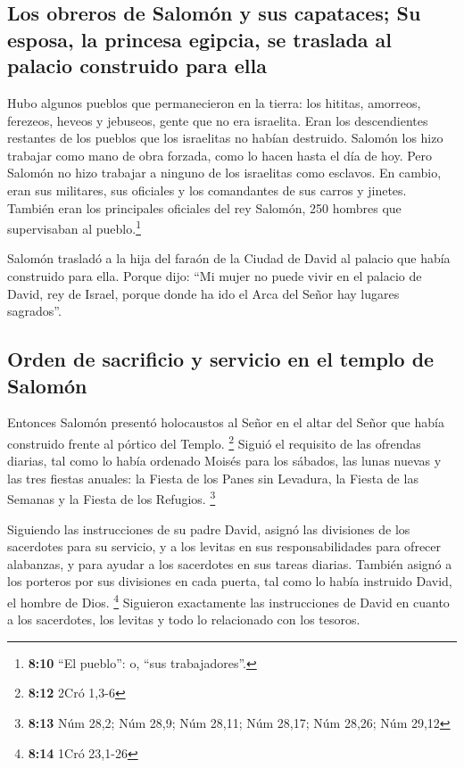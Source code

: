 \hypertarget{los-obreros-de-salomuxf3n-y-sus-capataces-su-esposa-la-princesa-egipcia-se-traslada-al-palacio-construido-para-ella}{%
\subsection{Los obreros de Salomón y sus capataces; Su esposa, la
princesa egipcia, se traslada al palacio construido para
ella}\label{los-obreros-de-salomuxf3n-y-sus-capataces-su-esposa-la-princesa-egipcia-se-traslada-al-palacio-construido-para-ella}}

 Hubo algunos pueblos que permanecieron en la tierra: los
hititas, amorreos, ferezeos, heveos y jebuseos, gente que no era
israelita.  Eran los descendientes restantes de los
pueblos que los israelitas no habían destruido. Salomón los hizo
trabajar como mano de obra forzada, como lo hacen hasta el día de hoy.
 Pero Salomón no hizo trabajar a ninguno de los israelitas
como esclavos. En cambio, eran sus militares, sus oficiales y los
comandantes de sus carros y jinetes.  También eran los
principales oficiales del rey Salomón, 250 hombres que supervisaban al
pueblo.\footnote{\textbf{8:10} ``El pueblo'': o, ``sus trabajadores''.}

 Salomón trasladó a la hija del faraón de la Ciudad de
David al palacio que había construido para ella. Porque dijo: ``Mi mujer
no puede vivir en el palacio de David, rey de Israel, porque donde ha
ido el Arca del Señor hay lugares sagrados''.

\hypertarget{orden-de-sacrificio-y-servicio-en-el-templo-de-salomuxf3n}{%
\subsection{Orden de sacrificio y servicio en el templo de
Salomón}\label{orden-de-sacrificio-y-servicio-en-el-templo-de-salomuxf3n}}

 Entonces Salomón presentó holocaustos al Señor en el
altar del Señor que había construido frente al pórtico del Templo.
\footnote{\textbf{8:12} 2Cró 1,3-6}  Siguió el requisito
de las ofrendas diarias, tal como lo había ordenado Moisés para los
sábados, las lunas nuevas y las tres fiestas anuales: la Fiesta de los
Panes sin Levadura, la Fiesta de las Semanas y la Fiesta de los
Refugios. \footnote{\textbf{8:13} Núm 28,2; Núm 28,9; Núm 28,11; Núm
  28,17; Núm 28,26; Núm 29,12}

 Siguiendo las instrucciones de su padre David, asignó
las divisiones de los sacerdotes para su servicio, y a los levitas en
sus responsabilidades para ofrecer alabanzas, y para ayudar a los
sacerdotes en sus tareas diarias. También asignó a los porteros por sus
divisiones en cada puerta, tal como lo había instruido David, el hombre
de Dios. \footnote{\textbf{8:14} 1Cró 23,1-26}  Siguieron
exactamente las instrucciones de David en cuanto a los sacerdotes, los
levitas y todo lo relacionado con los tesoros.

